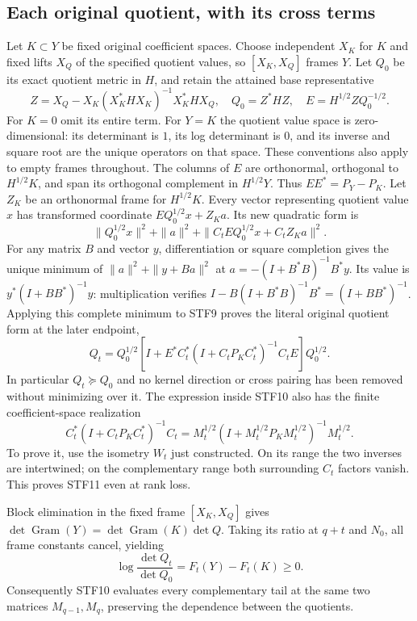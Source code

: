 \subsection{Each original quotient, with its cross terms}
Let $K\subset Y$ be fixed original coefficient spaces. Choose independent
$X_K$ for $K$ and fixed lifts $X_Q$ of the specified quotient values, so
$[X_K,X_Q]$ frames $Y$. Let $Q_0$ be its exact quotient metric in $H$,
and retain the attained base representative
\[
 Z=X_Q-X_K(X_K^*HX_K)^{-1}X_K^*HX_Q,\quad
 Q_0=Z^*HZ,\quad E=H^{1/2}ZQ_0^{-1/2}.                   \tag{STF8}
\]
For $K=0$ omit its entire term. For $Y=K$ the quotient value space
is zero-dimensional: its determinant is $1$, its log determinant is $0$,
and its inverse and square root are the unique operators on that space.
These conventions also apply to empty frames throughout.
The columns of $E$ are orthonormal,
orthogonal to $H^{1/2}K$, and span its orthogonal complement in
$H^{1/2}Y$. Thus $EE^*=P_Y-P_K$. Let $Z_K$ be an orthonormal frame
for $H^{1/2}K$. Every vector representing quotient value $x$ has
transformed coordinate $EQ_0^{1/2}x+Z_Ka$. Its new quadratic form is
\[
 \|Q_0^{1/2}x\|^2+\|a\|^2+
       \|C_tEQ_0^{1/2}x+C_tZ_Ka\|^2 .                   \tag{STF9}
\]
For any matrix $B$ and vector $y$, differentiation or square completion
gives the unique minimum of $\|a\|^2+\|y+Ba\|^2$ at
$a=-(I+B^*B)^{-1}B^*y$. Its value is
$y^*(I+BB^*)^{-1}y$: multiplication verifies
$I-B(I+B^*B)^{-1}B^*=(I+BB^*)^{-1}$.
Applying this complete minimum to STF9 proves the literal original
quotient form at the later endpoint,
\[
 Q_t=Q_0^{1/2}\left[I+E^*C_t^*(I+C_tP_KC_t^*)^{-1}C_tE\right]Q_0^{1/2}.
                                                               \tag{STF10}
\]
In particular $Q_t\succeq Q_0$ and no kernel direction or cross pairing
has been removed without minimizing over it. The expression inside
STF10 also has the finite coefficient-space realization
\[
 C_t^*(I+C_tP_KC_t^*)^{-1}C_t
 =M_t^{1/2}(I+M_t^{1/2}P_KM_t^{1/2})^{-1}M_t^{1/2}.       \tag{STF11}
\]
To prove it, use the isometry $W_t$ just constructed. On its range the
two inverses are intertwined; on the complementary range both surrounding
$C_t$ factors vanish. This proves STF11 even at rank loss.

Block elimination in the fixed frame $[X_K,X_Q]$ gives
$\det\operatorname{Gram}(Y)=\det\operatorname{Gram}(K)\det Q$.
Taking its ratio at $q+t$ and $N_0$, all frame constants cancel, yielding
\[
 \log\frac{\det Q_t}{\det Q_0}=F_t(Y)-F_t(K)\ge0.        \tag{STF12}
\]
Consequently STF10 evaluates every complementary tail at the same two
matrices $M_{q-1},M_q$, preserving the dependence between the quotients.

